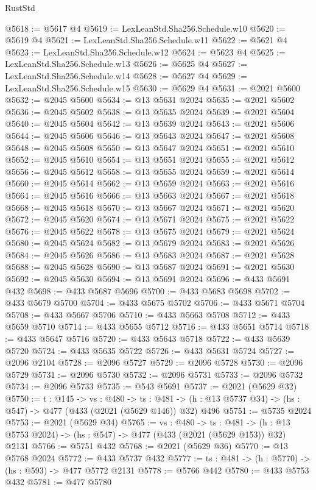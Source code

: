 \begin{lexlean}{RustStd}
\begin{coremodule}
@5618 := @5617 @4
@5619 := LexLeanStd.Sha256.Schedule.w10
@5620 := @5619 @4
@5621 := LexLeanStd.Sha256.Schedule.w11
@5622 := @5621 @4
@5623 := LexLeanStd.Sha256.Schedule.w12
@5624 := @5623 @4
@5625 := LexLeanStd.Sha256.Schedule.w13
@5626 := @5625 @4
@5627 := LexLeanStd.Sha256.Schedule.w14
@5628 := @5627 @4
@5629 := LexLeanStd.Sha256.Schedule.w15
@5630 := @5629 @4
@5631 := @2021 @5600
@5632 := @2045 @5600
@5634 := @13 @5631 @2024
@5635 := @2021 @5602
@5636 := @2045 @5602
@5638 := @13 @5635 @2024
@5639 := @2021 @5604
@5640 := @2045 @5604
@5642 := @13 @5639 @2024
@5643 := @2021 @5606
@5644 := @2045 @5606
@5646 := @13 @5643 @2024
@5647 := @2021 @5608
@5648 := @2045 @5608
@5650 := @13 @5647 @2024
@5651 := @2021 @5610
@5652 := @2045 @5610
@5654 := @13 @5651 @2024
@5655 := @2021 @5612
@5656 := @2045 @5612
@5658 := @13 @5655 @2024
@5659 := @2021 @5614
@5660 := @2045 @5614
@5662 := @13 @5659 @2024
@5663 := @2021 @5616
@5664 := @2045 @5616
@5666 := @13 @5663 @2024
@5667 := @2021 @5618
@5668 := @2045 @5618
@5670 := @13 @5667 @2024
@5671 := @2021 @5620
@5672 := @2045 @5620
@5674 := @13 @5671 @2024
@5675 := @2021 @5622
@5676 := @2045 @5622
@5678 := @13 @5675 @2024
@5679 := @2021 @5624
@5680 := @2045 @5624
@5682 := @13 @5679 @2024
@5683 := @2021 @5626
@5684 := @2045 @5626
@5686 := @13 @5683 @2024
@5687 := @2021 @5628
@5688 := @2045 @5628
@5690 := @13 @5687 @2024
@5691 := @2021 @5630
@5692 := @2045 @5630
@5694 := @13 @5691 @2024
@5696 := @433 @5691 @432
@5698 := @433 @5687 @5696
@5700 := @433 @5683 @5698
@5702 := @433 @5679 @5700
@5704 := @433 @5675 @5702
@5706 := @433 @5671 @5704
@5708 := @433 @5667 @5706
@5710 := @433 @5663 @5708
@5712 := @433 @5659 @5710
@5714 := @433 @5655 @5712
@5716 := @433 @5651 @5714
@5718 := @433 @5647 @5716
@5720 := @433 @5643 @5718
@5722 := @433 @5639 @5720
@5724 := @433 @5635 @5722
@5726 := @433 @5631 @5724
@5727 := @2096 @2104
@5728 := @2096 @5727
@5729 := @2096 @5728
@5730 := @2096 @5729
@5731 := @2096 @5730
@5732 := @2096 @5731
@5733 := @2096 @5732
@5734 := @2096 @5733
@5735 := @543 @5691
@5737 := @2021 (@5629 @32)
@5750 := {t : @145} ->
  {vs : @480} ->
  {ts : @481} -> (h : @13 @5737 @34) -> (hs : @547) -> @477 (@433 (@2021 (@5629 @146)) @32) @496
@5751 := @5735 @2024
@5753 := @2021 (@5629 @34)
@5765 := {vs : @480} ->
  {ts : @481} -> (h : @13 @5753 @2024) -> (hs : @547) -> @477 (@433 (@2021 (@5629 @153)) @32) @2131
@5766 := @5751 @432
@5768 := @2021 (@5629 @36)
@5770 := @13 @5768 @2024
@5772 := @433 @5737 @432
@5777 := {ts : @481} -> (h : @5770) -> (hs : @593) -> @477 @5772 @2131
@5778 := @5766 @442
@5780 := @433 @5753 @432
@5781 := @477 @5780

\end{coremodule}
\end{lexlean}
